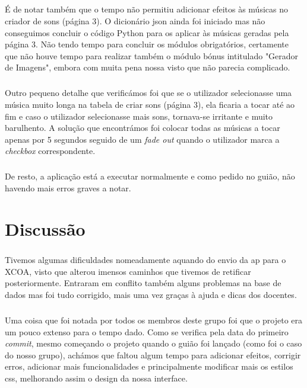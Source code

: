 \documentclass[a4paper]{report}
\begin{document}
\paragraph{}É de notar também que o tempo não permitiu adicionar efeitos às músicas no criador de sons (página 3). O dicionário \ac{json} ainda foi iniciado mas não conseguimos concluir o código Python para os aplicar às músicas geradas pela página 3. Não tendo tempo para concluir os módulos obrigatórios, certamente que não houve tempo para realizar também o módulo bónus intitulado "Gerador de Imagens", embora com muita pena nossa visto que não parecia complicado.

\paragraph{}Outro pequeno detalhe que verificámos foi que se o utilizador selecionasse uma música muito longa na tabela de criar sons (página 3), ela ficaria a tocar até ao fim e caso o utilizador selecionasse mais sons, tornava-se irritante e muito barulhento. A solução que encontrámos foi colocar todas as músicas a tocar apenas por 5 segundos seguido de um \textit{fade out} quando o utilizador marca a \textit{checkbox} correspondente.

\paragraph{}De resto, a aplicação está a executar normalmente e como pedido no guião, não havendo mais erros graves a notar.

\newpage

\chapter{Discussão}
\label{chap.discussao}

\paragraph{}Tivemos algumas dificuldades nomeadamente aquando do envio da \ac{ap} para o XCOA, visto que alterou imensos caminhos que tivemos de retificar posteriormente. Entraram em conflito também alguns problemas na base de dados mas foi tudo corrigido, mais uma vez graças à ajuda e dicas dos docentes.

\paragraph{}Uma coisa que foi notada por todos os membros deste grupo foi que o projeto era um pouco extenso para o tempo dado. Como se verifica pela data do primeiro \textit{commit}, mesmo começando o projeto quando o guião foi lançado (como foi o caso do nosso grupo), achámos que faltou algum tempo para adicionar efeitos, corrigir erros, adicionar mais funcionalidades e principalmente modificar mais os estilos \ac{css}, melhorando assim o design da nossa interface.
\end{document}
